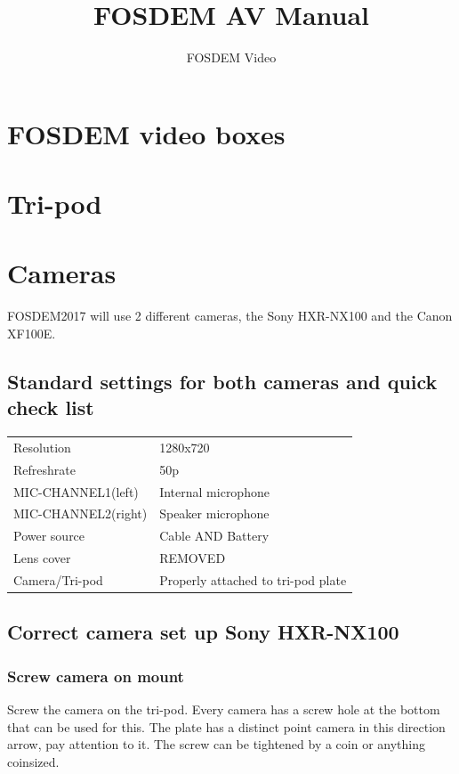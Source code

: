 \documentclass{article}
\title{FOSDEM AV Manual}
\author{FOSDEM Video}
\begin{document}
\maketitle \thispagestyle{empty}
\newpage

\tableofcontents
\newpage

\section{FOSDEM video boxes}

\section{Tri-pod}

\section{Cameras}
FOSDEM2017 will use 2 different cameras, the Sony HXR-NX100 and the Canon XF100E.

\subsection{Standard settings for both cameras and quick check list}
\begin{tabular}{| l | l |}
Resolution & 1280x720 \\
Refreshrate & 50p \\
MIC-CHANNEL1(left) & Internal microphone \\
MIC-CHANNEL2(right) & Speaker microphone \\
Power source & Cable AND Battery \\
Lens cover & REMOVED \\
Camera/Tri-pod & Properly attached to tri-pod plate \\
\end{tabular}

\subsection{Correct camera set up Sony HXR-NX100}

\subsubsection{Screw camera on mount}
Screw the camera on the tri-pod. Every camera has a screw hole at the bottom that can be used for this. The plate has a distinct point camera in this direction arrow, pay attention to it. The screw can be tightened by a coin or anything coinsized.
\end{document}
